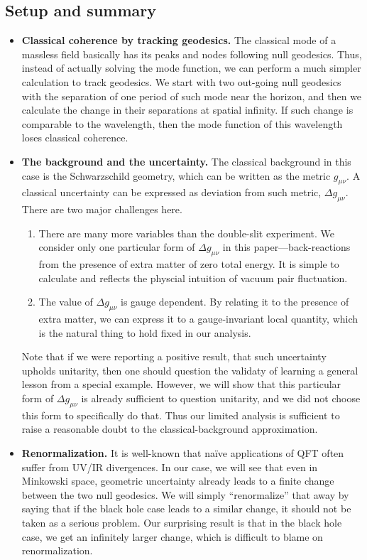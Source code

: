 \documentclass[aps,showpacs,twocolumn,floats,prd,superscriptaddress,nofootinbib]{revtex4-1}
\begin{document}
\subsection{Setup and summary}

\begin{itemize}
\item {\bf Classical coherence by tracking geodesics.} The classical mode of a massless field basically has its peaks and nodes following null geodesics.
Thus, instead of actually solving the mode function, we can perform a much simpler calculation to track geodesics.
We start with two out-going null geodesics with the separation of one period of such mode near the horizon, and then we calculate the change in their separations at spatial infinity.
If such change is comparable to the wavelength, then the mode function of this wavelength loses classical coherence.
\item {\bf The background and the uncertainty.} The classical background in this case is the Schwarzschild geometry, which can be written as the metric $g_{\mu\nu}$. 
A classical uncertainty can be expressed as deviation from such metric, $\Delta g_{\mu\nu}$. 
There are two major challenges here.
\begin{enumerate}
\item There are many more variables than the double-slit experiment. 
We consider only one particular form of $\Delta g_{\mu\nu}$ in this paper---back-reactions from the presence of extra matter of zero total energy. 
It is simple to calculate and reflects the physcial intuition of vacuum pair fluctuation.
\item The value of $\Delta g_{\mu\nu}$ is gauge dependent. 
By relating it to the presence of extra matter, we can express it to a gauge-invariant local quantity, which is the natural thing to hold fixed in our analysis.
\end{enumerate}
Note that if we were reporting a positive result, that such uncertainty upholds unitarity, then one should question the validaty of learning a general lesson from a special example. However, we will show that this particular form of $\Delta g_{\mu\nu}$ is already sufficient to question unitarity, and we did not choose this form to specifically do that. Thus our limited analysis is sufficient to raise a reasonable doubt to the classical-background approximation.
\item {\bf Renormalization.} It is well-known that na\"ive applications of QFT often suffer from UV/IR divergences.
In our case, we will see that even in Minkowski space, geometric uncertainty already leads to a finite change between the two null geodesics.
We will simply ``renormalize'' that away by saying that if the black hole case leads to a similar change, it should not be taken as a serious problem.
Our surprising result is that in the black hole case, we get an infinitely larger change, which is difficult to blame on renormalization.
\end{itemize}
\end{document}
